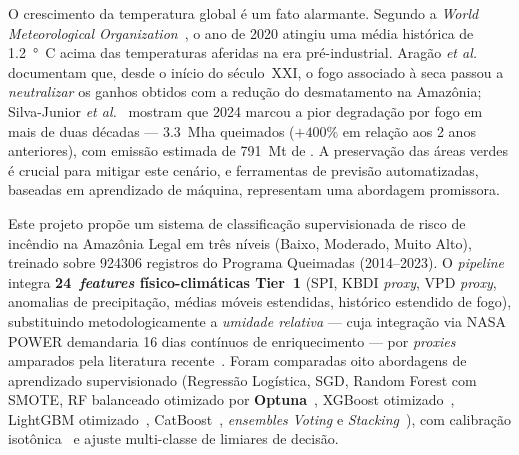 %

\begin{resumo}
O crescimento da temperatura global é um fato alarmante. Segundo a \emph{World Meteorological Organization}~\cite{wmo2021}, o ano de 2020 atingiu uma média histórica de \SI{1,2}{\degree C} acima das temperaturas aferidas na era pré-industrial. Aragão \emph{et al.}~\cite{aragao2018amazon} documentam que, desde o início do século~XXI, o fogo associado à seca passou a \emph{neutralizar} os ganhos obtidos com a redução do desmatamento na Amazônia; Silva-Junior \emph{et al.}~\cite{silvajunior2025amazon} mostram que 2024 marcou a pior degradação por fogo em mais de duas décadas --- \SI{3,3}{\mega\hectare} queimados (\(+400\%\) em relação aos 2 anos anteriores), com emissão estimada de \SI{791}{\mega\tonne} de . A preservação das áreas verdes é crucial para mitigar este cenário, e ferramentas de previsão automatizadas, baseadas em aprendizado de máquina, representam uma abordagem promissora.

Este projeto propõe um sistema de classificação supervisionada de risco de incêndio na Amazônia Legal em três níveis (Baixo, Moderado, Muito Alto), treinado sobre \num{924306} registros do Programa Queimadas (2014--2023). O \emph{pipeline} integra \textbf{24~\emph{features} físico-climáticas Tier~1} (SPI, KBDI \emph{proxy}, VPD \emph{proxy}, anomalias de precipitação, médias móveis estendidas, histórico estendido de fogo), substituindo metodologicamente a \emph{umidade relativa} --- cuja integração via NASA POWER demandaria 16 dias contínuos de enriquecimento --- por \emph{proxies} amparados pela literatura recente~\cite{seager2015climatology,forests2024cerradoamazon,npjhazards2025fire}. Foram comparadas oito abordagens de aprendizado supervisionado (Regressão Logística, SGD, Random Forest com SMOTE, RF balanceado otimizado por \textbf{Optuna}~\cite{akiba2019optuna}, XGBoost otimizado~\cite{chen2016xgboost}, LightGBM otimizado~\cite{ke2017lightgbm}, CatBoost~\cite{prokhorenkova2018catboost}, \emph{ensembles} \emph{Voting} e \emph{Stacking}~\cite{wolpert1992stacked}), com calibração isotônica~\cite{zadrozny2002transforming} e ajuste multi-classe de limiares de decisão.


\end{resumo}
